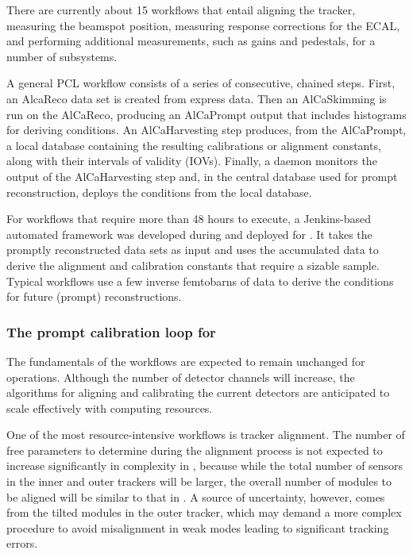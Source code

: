 There are currently about 15 workflows that entail aligning the tracker, measuring the beamspot position, measuring response corrections for the \gls{ECAL}, and performing additional measurements, such as gains and pedestals, for a number of subsystems.

A general \gls{PCL} workflow consists of a series of consecutive, chained steps. First, an AlcaReco data set is created from express data. Then an AlCaSkimming is run on the AlCaReco, producing an AlCaPrompt output that includes histograms for deriving conditions. An AlCaHarvesting step produces, from the AlCaPrompt, a local database containing the resulting calibrations or alignment constants, along with their intervals of validity (IOVs). Finally, a daemon monitors the output of the AlCaHarvesting step and, in the central database used for prompt reconstruction, deploys the conditions from the local database.

For workflows that require more than 48 hours to execute, a Jenkins-based automated framework was developed during \LSTwo and deployed for \RunThree. It takes the promptly reconstructed data sets as input and uses the accumulated data to derive the alignment and calibration constants that require a sizable sample. Typical workflows use a few inverse femtobarns of data to derive the conditions for future (prompt) reconstructions.

\subsubsection{The prompt calibration loop for \PhaseTwo}

The fundamentals of the \RunThree workflows are expected to remain unchanged for \PhaseTwo operations. Although the number of detector channels will increase, the algorithms for aligning and calibrating the current detectors are anticipated to scale effectively with \PhaseTwo computing resources.

One of the most resource-intensive workflows is tracker alignment. The number of free parameters to determine during the alignment process is not expected to increase significantly in complexity in \PhaseTwo, because while the total number of sensors in the inner and outer trackers will be larger, the overall number of modules to be aligned will be similar to that in \PhaseOne. A source of uncertainty, however, comes from the tilted modules in the outer tracker, which may demand a more complex procedure to avoid misalignment in weak modes leading to significant tracking errors.


